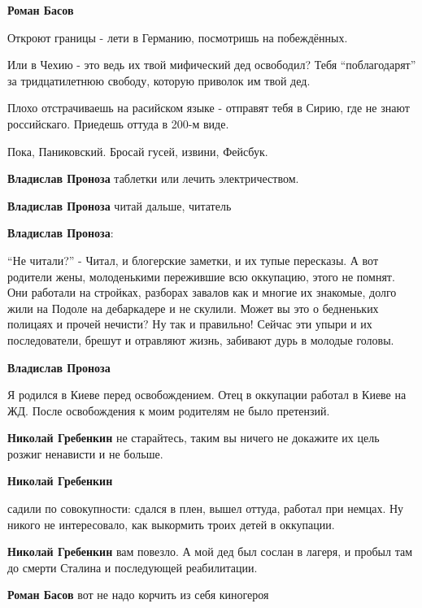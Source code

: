\begin{itemize}
\begin{itemize}
\begin{itemize}
\textbf{Роман Басов} 

Откроют границы - лети в Германию, посмотришь на побеждённых.

Или в Чехию - это ведь их твой мифический дед освободил? Тебя \enquote{поблагодарят} за
тридцатилетнюю свободу, которую приволок им твой дед.

Плохо отстрачиваешь на расийском языке - отправят тебя в Сирию, где не знают
российскаго. Приедешь оттуда в 200-м виде.

Пока, Паниковский. Бросай гусей, извини, Фейсбук.

\textbf{Владислав Проноза} таблетки или лечить электричеством.

\end{itemize} %

\textbf{Владислав Проноза} читай дальше, читатель

\textbf{Владислав Проноза}:

\enquote{Не читали?} - Читал, и блогерские заметки, и их тупые пересказы. А вот
родители жены, молоденькими пережившие всю оккупацию, этого не помнят. Они
работали на стройках, разборах завалов как и многие их знакомые, долго жили на
Подоле на дебаркадере и не скулили. Может вы это о бедненьких полицаях и прочей
нечисти? Ну так и правильно! Сейчас эти упыри и их последователи, брешут и
отравляют жизнь, забивают дурь в молодые головы.

\textbf{Владислав Проноза} 

Я родился в Киеве перед освобождением. Отец в оккупации работал в Киеве на ЖД.
После освобождения к моим родителям не было претензий.

\begin{itemize} %
\textbf{Николай Гребенкин} не старайтесь, таким вы ничего не докажите их цель розжиг ненависти и не больше.

\textbf{Николай Гребенкин} 

садили по совокупности: сдался в плен, вышел оттуда, работал при немцах. Ну
никого не интересовало, как выкормить троих детей в оккупации.


\textbf{Николай Гребенкин} вам повезло. А мой дед был сослан в лагеря, и пробыл там до смерти Сталина и последующей реабилитации.
\end{itemize} %

\textbf{Роман Басов} вот не надо корчить из себя киногероя


\end{itemize}
\end{itemize}
